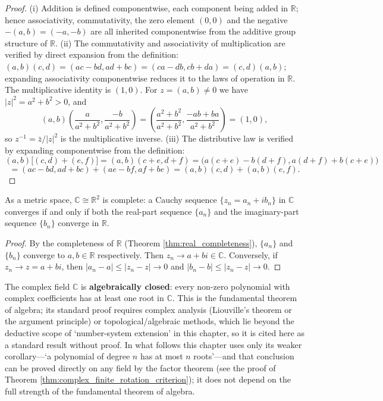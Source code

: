 \begin{proof}
(i) Addition is defined componentwise, each component being added in $\mathbb{R}$; hence associativity, commutativity, the zero element $(0,0)$ and the negative $-(a,b) = (-a,-b)$ are all inherited componentwise from the additive group structure of $\mathbb{R}$.
(ii) The commutativity and associativity of multiplication are verified by direct expansion from the definition: $(a,b)(c,d) = (ac-bd, ad+bc) = (ca-db, cb+da) = (c,d)(a,b)$; expanding associativity componentwise reduces it to the laws of operation in $\mathbb{R}$. The multiplicative identity is $(1,0)$. For $z = (a,b) \neq 0$ we have $|z|^2 = a^2+b^2 > 0$, and
\[
(a,b)\left(\frac{a}{a^2+b^2}, \frac{-b}{a^2+b^2}\right) = \left(\frac{a^2+b^2}{a^2+b^2}, \frac{-ab+ba}{a^2+b^2}\right) = (1,0),
\]
so $z^{-1} = \bar{z}/|z|^2$ is the multiplicative inverse.
(iii) The distributive law is verified by expanding componentwise from the definition:
\[
(a,b)\bigl[(c,d)+(e,f)\bigr] = (a,b)(c+e, d+f) = \bigl(a(c+e)-b(d+f), a(d+f)+b(c+e)\bigr)
\]
\[
= (ac-bd, ad+bc) + (ae-bf, af+be) = (a,b)(c,d) + (a,b)(e,f).
\]
\end{proof}

\begin{proposition}\label{prop:complex_completeness}
As a metric space, $\mathbb{C} \cong \mathbb{R}^2$ is complete: a Cauchy sequence $\{z_n = a_n + ib_n\}$ in $\mathbb{C}$ converges if and only if both the real-part sequence $\{a_n\}$ and the imaginary-part sequence $\{b_n\}$ converge in $\mathbb{R}$.
\end{proposition}

\begin{proof}
By the completeness of $\mathbb{R}$ (Theorem \ref{thm:real_completeness}), $\{a_n\}$ and $\{b_n\}$ converge to $a, b \in \mathbb{R}$ respectively. Then $z_n \to a + bi \in \mathbb{C}$. Conversely, if $z_n \to z = a+bi$, then $|a_n - a| \le |z_n - z| \to 0$ and $|b_n - b| \le |z_n - z| \to 0$.
\end{proof}

\begin{remark}\label{rem:fta}
The complex field $\mathbb{C}$ is \textbf{algebraically closed}: every non-zero polynomial with complex coefficients has at least one root in $\mathbb{C}$. This is the fundamental theorem of algebra; its standard proof requires complex analysis (Liouville's theorem or the argument principle) or topological/algebraic methods, which lie beyond the deductive scope of `number-system extension' in this chapter, so it is cited here as a standard result without proof. In what follows this chapter uses only its weaker corollary---`a polynomial of degree $n$ has at most $n$ roots'---and that conclusion can be proved directly on any field by the factor theorem (see the proof of Theorem \ref{thm:complex_finite_rotation_criterion}); it does not depend on the full strength of the fundamental theorem of algebra.
\end{remark}

